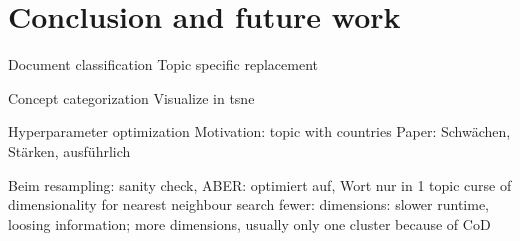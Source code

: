 \documentclass[
        a4paper,
        titlepage,
        twoside,
        parskip,
        numbers=noenddot
        ]{scrbook}
\theoremstyle{break}
\begin{document}
\chapter{Conclusion and future work}
\label{sec:conclusion}

Document classification
Topic specific replacement

Concept categorization
Visualize in tsne

Hyperparameter optimization
Motivation: topic with countries
Paper: Schwächen, Stärken, ausführlich

Beim resampling: sanity check, ABER: optimiert auf, Wort nur in 1 topic
curse of dimensionality for nearest neighbour search
fewer: dimensions: slower runtime, loosing information; more dimensions, usually only one cluster because of CoD

\clearpage
\end{document}
